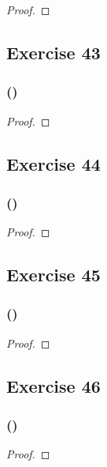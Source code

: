\documentclass[14pt]{extarticle}
\begin{document}
\begin{proof}

\end{proof}

\subsection{Exercise 43}

\subsubsection{()}

\begin{proof}

\end{proof}

\subsection{Exercise 44}

\subsubsection{()}

\begin{proof}

\end{proof}

\subsection{Exercise 45}

\subsubsection{()}

\begin{proof}

\end{proof}

\subsection{Exercise 46}

\subsubsection{()}

\begin{proof}

\end{proof}
\end{document}
